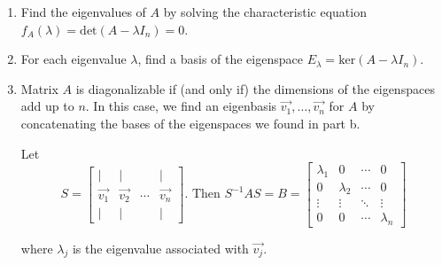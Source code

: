 \begin{enumerate}
\item Find the eigenvalues of $A$ by solving the characteristic equation $f_{A}(\lambda{})=\textrm{det}(A-\lambda{}I_{n})=0$.
\item For each eigenvalue $\lambda{}$, find a basis of the eigenspace $E_{\lambda{}}=\textrm{ker}(A-\lambda{}I_{n})$.
\item Matrix $A$ is diagonalizable if (and only if) the dimensions of the eigenspaces add up to $n$. In this case, we find an eigenbasis $\vec{v_{1}},\ldots{},\vec{v_{n}}$ for $A$ by concatenating the bases of the eigenspaces we found in part b.
\par\noindent Let
\[S=\left[\begin{array}{cccc}|&|&&|\\{} \vec{v_{1}}&\vec{v_{2}}&\cdots{}&\vec{v_{n}}\\{} |&|&&|\end{array}\right]\textrm{. Then }S^{-1}AS=B=\left[\begin{array}{cccc}\lambda{}_{1}&0&\cdots{}&0\\ 0&\lambda{}_{2}&\cdots{}&0\\ \vdots{}&\vdots{}&\ddots{}&\vdots{}\\ 0&0&\cdots{}&\lambda{}_{n}\end{array}\right]\]
\par\noindent where $\lambda{}_{j}$ is the eigenvalue associated with $\vec{v_{j}}$.
\end{enumerate}

